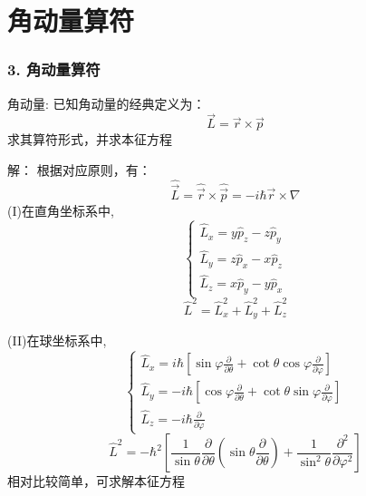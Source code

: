 \section{角动量算符}
\begin{frame} [allowframebreaks=]
    \frametitle{3. 角动量算符}
    \begin{tcolorbox1}{角动量:}
        已知角动量的经典定义为：
    $$\vec{L}=\vec{r}\times\vec{p}$$ 
    求其算符形式，并求本征方程     
     \end{tcolorbox1}
    \alert{解：} 根据对应原则，有：
    $$\hat{\vec{L}}=\hat{\vec{r}}\times\hat{\vec{p}}= -i\hbar \vec{r}\times\nabla$$
    (I)在直角坐标系中,\\
    $$
    \left \{
    \begin{array}{l} 
        \hat{L}_x=y\hat{p}_z-z\hat{p}_y  \\ 
        \hat{L}_y=z\hat{p}_x-x\hat{p}_z  \\ 
        \hat{L}_z=x\hat{p}_y-y\hat{p}_x 
    \end{array}
    \right.
    $$
    $$ \hat{L}^2= \hat{L}_x ^2+ \hat{L}_y ^2 +\hat{L}_z ^2  $$

    (II)在球坐标系中,\\
    $$
    \left\{\begin{array}{l}
        \hat{L}_{x}=i \hbar\left[\sin \varphi \frac{\partial}{\partial \theta}+\cot \theta \cos \varphi \frac{\partial}{\partial \varphi}\right] \\
        \hat{L}_{y}=-i \hbar\left[\cos \varphi \frac{\partial}{\partial \theta}+\cot \theta \sin \varphi \frac{\partial}{\partial \varphi}\right] \\
        \hat{L}_{z}=-i \hbar \frac{\partial}{\partial \varphi}
        \end{array}\right.
    $$
    $$ \hat{L}^{2}=-\hbar^{2}\left[\frac{1}{\sin \theta} \frac{\partial}{\partial \theta}\left(\sin \theta \frac{\partial}{\partial \theta}\right)+\frac{1}{\sin ^{2} \theta} \frac{\partial^{2}}{\partial \varphi^{2}}\right] $$
    相对比较简单，可求解本征方程
\end{frame} 

